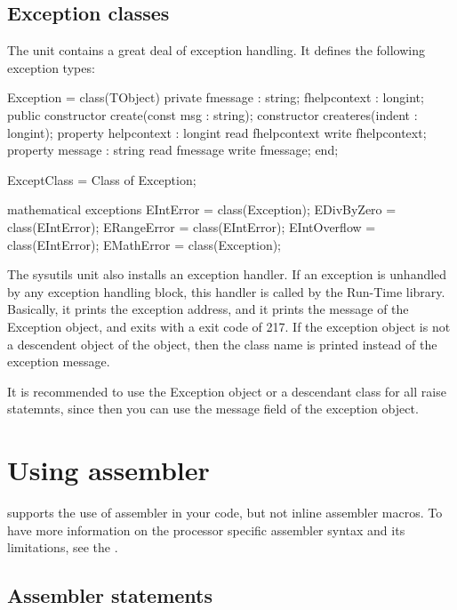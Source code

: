 \documentclass{report}
\begin{document}
\section{Exception classes}
\label{se:exceptclasses}

The  unit contains a great deal of exception handling.
It defines the following exception types:
\begin{listing}
       Exception = class(TObject)
        private
          fmessage : string;
          fhelpcontext : longint;
        public
          constructor create(const msg : string);
          constructor createres(indent : longint);
          property helpcontext : longint read fhelpcontext write fhelpcontext;
          property message : string read fmessage write fmessage;
       end;

       ExceptClass = Class of Exception;

       { mathematical exceptions }
       EIntError = class(Exception);
       EDivByZero = class(EIntError);
       ERangeError = class(EIntError);
       EIntOverflow = class(EIntError);
       EMathError = class(Exception);
\end{listing}

The sysutils unit also installs an exception handler. If an exception is
unhandled by any exception handling block, this handler is called by the
Run-Time library. Basically, it prints the exception address, and it prints 
the message of the Exception object, and exits with a exit code of 217.
If the exception object is not a descendent object of the 
object, then the class name is printed instead of the exception message.

It is recommended to use the Exception object or a descendant class for 
all raise statemnts, since then you can use the message field of the
exception object.

\chapter{Using assembler}

\fpc supports the use of assembler in your code, but not inline
assembler macros.  To have more information on the processor
specific assembler syntax and its limitations, see the \progref.

\section{Assembler statements }
\end{document}
